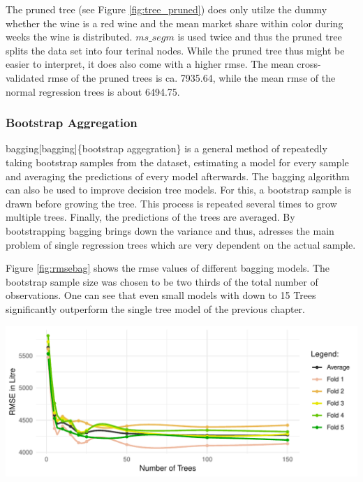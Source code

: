 \documentclass[11pt,]{article}
\let\origfigure\figure
\let\endorigfigure\endfigure
\renewenvironment{figure}[1][2] {
    \expandafter\origfigure\expandafter[H]
} {
    \endorigfigure
}
\begin{document}
The pruned tree (see Figure \ref{fig:tree_pruned}) does only utilze the
dummy whether the wine is a red wine and the mean market share within
color during weeks the wine is distributed. \(ms\_segm\) is used twice
and thus the pruned tree splits the data set into four terinal nodes.
While the pruned tree thus might be easier to interpret, it does also
come with a higher \ac{rmse}. The mean cross-validated \ac{rmse} of the
pruned trees is ca. 7935.64, while the mean \ac{rmse} of the normal
regression trees is about 6494.75.

\hypertarget{bootstrap-aggregation}{%
\subsubsection{Bootstrap Aggregation}\label{bootstrap-aggregation}}

\ac{bagging}{[}bagging{]}\{bootstrap aggegration\} is a general method
of repeatedly taking bootstrap samples from the dataset, estimating a
model for every sample and averaging the predictions of every model
afterwards. The \ac{bagging} algorithm can also be used to improve
decision tree models. For this, a bootstrap sample is drawn before
growing the tree. This process is repeated several times to grow
multiple trees. Finally, the predictions of the trees are averaged. By
bootstrapping \ac{bagging} brings down the variance and thus, adresses
the main problem of single regression trees which are very dependent on
the actual sample.

Figure \ref{fig:rmsebag} shows the \ac{rmse} values of different
\ac{bagging} models. The bootstrap sample size was chosen to be two
thirds of the total number of observations. One can see that even small
models with down to 15 Trees significantly outperform the single tree
model of the previous chapter.

\begin{figure}

\includegraphics{../00_data/output_paper/14_bagging} \hfill{}

\caption[Bagging: RMSE's at Different Tree Sizes]{\label{fig:rmsebag}Bagging: RMSE's at Different Tree Sizes (Smoothed).}\label{fig:bag}
\end{figure}
\end{document}
